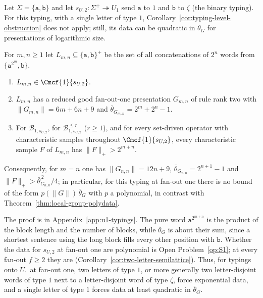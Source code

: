 Let $\Sigma=\{\mathtt a,\mathtt b\}$ and let $s_{U,2}:\Sigma^+\twoheadrightarrow U_1$ send $\mathtt a$ to
$1$ and $\mathtt b$ to $\zeta$ (the binary typing).  For this typing, with a single letter of type $1$,
Corollary~\ref{cor:typing-level-obstruction} does not apply; still, its data can
be quadratic in $\bar\theta_G$ for presentations of logarithmic size.

\begin{proposition}
\label{prop:binary-u1-quadratic}
For $m,n\ge1$ let $L_{m,n}\subseteq\{\mathtt a,\mathtt b\}^+$ be the set of all
concatenations of $2^n$ words from $\{\mathtt a^{2^m},\mathtt b\}$.
\begin{enumerate}[label=\textup{(\roman*)},leftmargin=*]
\item $L_{m,n}\in\Cmcf{1}{s_{U,2}}$.
\item $L_{m,n}$ has a reduced good fan-out-one presentation $G_{m,n}$ of rule rank
two with $\|G_{m,n}\|=6m+6n+9$ and $\bar\theta_{G_{m,n}}=2^m+2^n-1$.
\item For $\mathcal B_{1,s_{U,2}}$, for $\mathcal B^{\le r}_{1,s_{U,2}}$ \textup($r\ge1$\textup),
and for every set-driven operator with characteristic samples throughout
$\Cmcf{1}{s_{U,2}}$, every characteristic sample $F$ of $L_{m,n}$ has
$\|F\|_+>2^{m+n}$.
\end{enumerate}
Consequently, for $m=n$ one has $\|G_{n,n}\|=12n+9$, $\bar\theta_{G_{n,n}}=2^{n+1}-1$
and $\|F\|_+>\bar\theta_{G_{n,n}}^{\,2}/4$; in particular, for this typing at
fan-out one there is no bound of the form $p(\|G\|)\,\bar\theta_G$ with $p$ a
polynomial, in contrast with Theorem~\ref{thm:local-group-polydata}.
\end{proposition}

The proof is in Appendix~\ref{app:u1-typings}.  The pure word
$\mathtt a^{2^{m+n}}$ is the product of the block length and the number of
blocks, while $\bar\theta_G$ is about their sum, since a shortest sentence using
the long block fills every other position with $\mathtt b$.  Whether the data
for $s_{U,2}$ at fan-out one are polynomial is Open Problem~\ref{op:S1}; at
every fan-out $f\ge2$ they are (Corollary~\ref{cor:two-letter-semilattice}).
Thus, for typings onto $U_1$ at fan-out one, two letters of type $1$, or more
generally two letter-disjoint words of type $1$ next to a letter-disjoint word of
type $\zeta$, force exponential data, and a single letter of type $1$ forces data at least
quadratic in $\bar\theta_G$.


